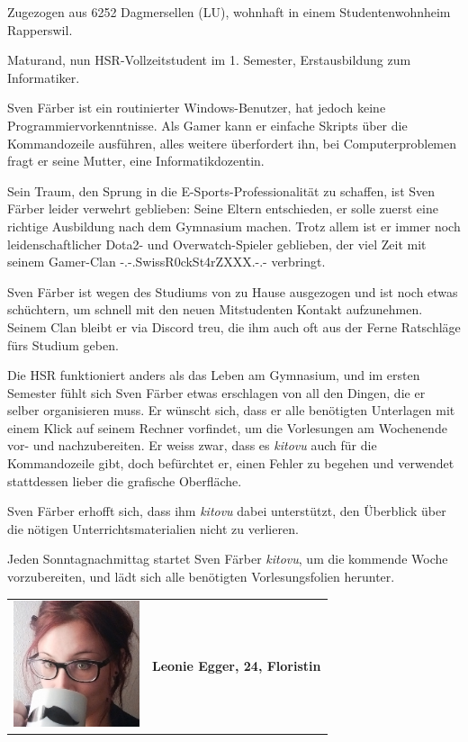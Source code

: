 \documentclass[a4paper]{article}
\begin{document}
\begin{description}[uclist]
	\item[Adresse] Zugezogen aus 6252 Dagmersellen (LU), wohnhaft in einem Studentenwohnheim Rapperswil.
	\item[Ausbildung und Beruf] Maturand, nun HSR-Vollzeitstudent im 1. Semester, Erstausbildung zum Informatiker.
	\item[Informatikkenntnisse] Sven Färber ist ein routinierter Windows-Benutzer, hat jedoch keine Programmiervorkenntnisse. Als Gamer kann er einfache Skripts über die Kommandozeile ausführen, alles weitere überfordert ihn, bei Computerproblemen fragt er seine Mutter, eine Informatikdozentin.
	\item[Freizeitbeschäftigung] Sein Traum, den Sprung in die E-Sports-Professionalität zu schaffen, ist Sven Färber leider verwehrt geblieben: Seine Eltern entschieden, er solle zuerst eine richtige Ausbildung nach dem Gymnasium machen. Trotz allem ist er immer noch leidenschaftlicher Dota2- und Overwatch-Spieler geblieben, der viel Zeit mit seinem Gamer-Clan -.-.SwissR0ckSt4rZXXX.-.- verbringt.
	\item[Persönlichkeit] Sven Färber ist wegen des Studiums von zu Hause ausgezogen und ist noch etwas schüchtern, um schnell mit den neuen Mitstudenten Kontakt aufzunehmen. Seinem Clan bleibt er via Discord treu, die ihm auch oft aus der Ferne Ratschläge fürs Studium geben.
	\item[Einschränkungen, Ziele und Wünsche] Die HSR funktioniert anders als das Leben am Gymnasium, und im ersten Semester fühlt sich Sven Färber etwas erschlagen von all den Dingen, die er selber organisieren muss. Er wünscht sich, dass er alle benötigten Unterlagen mit einem Klick auf seinem Rechner vorfindet, um die Vorlesungen am Wochenende vor- und nachzubereiten. Er weiss zwar, dass es \emph{kitovu} auch für die Kommandozeile gibt, doch befürchtet er, einen Fehler zu begehen und verwendet stattdessen lieber die grafische Oberfläche.
	\item[Erwartungen an \emph{kitovu}] Sven Färber erhofft sich, dass ihm \emph{kitovu} dabei unterstützt, den Überblick über die nötigen Unterrichtsmaterialien nicht zu verlieren.
	\item[Szenario: Beschäftigter Vollzeitstudent] Jeden Sonntagnachmittag startet Sven Färber \emph{kitovu}, um die kommende Woche vorzubereiten, und lädt sich alle benötigten Vorlesungsfolien herunter.
\end{description}

\pagebreak
\begin{tabulary}{\linewidth}{m{10em}l}
	\includegraphics[width=10em]{../../img/diverseui01.png} & \textbf{{\large Leonie Egger, 24, Floristin}} \\
\end{tabulary}
\end{document}
